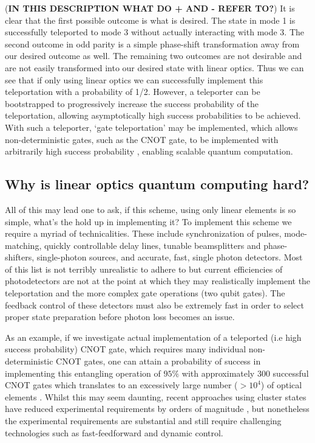 \documentclass[aps,pra,twocolumn,amsmath,amssymb,nofootinbib,superscriptaddress]{revtex4}
\begin{document}
(\textbf{IN THIS DESCRIPTION WHAT DO + AND - REFER TO?}) It is clear that the first possible outcome is what is desired. The state in mode 1 is successfully teleported to mode 3 without actually interacting with mode 3. The second outcome in odd parity is a simple phase-shift transformation away from our desired outcome as well. The remaining two outcomes are not desirable and are not easily transformed into our desired state with linear optics. Thus we can see that if only using linear optics we can successfully implement this teleportation with a probability of 1/2. However, a teleporter can be bootstrapped to progressively increase the success probability of the teleportation, allowing asymptotically high success probabilities to be achieved. With such a teleporter, `gate teleportation' may be implemented, which allows non-deterministic gates, such as the CNOT gate, to be implemented with arbitrarily high success probability \cite{knill}, enabling scalable quantum computation.

\subsection{Why is linear optics quantum computing hard?}

All of this may lead one to ask, if this scheme, using only linear elements is so simple, what's the hold up in implementing it? To implement this scheme we require a myriad of technicalities. These include synchronization of pulses, mode-matching, quickly controllable delay lines, tunable beamsplitters and phase-shifters, single-photon sources, and accurate, fast, single photon detectors. Most of this list is not terribly unrealistic to adhere to but current efficiencies of photodetectors are not at the point at which they may realistically implement the teleportation and the more complex gate operations (two qubit gates). The feedback control of these detectors must also be extremely fast in order to select proper state preparation before photon loss becomes an issue.

As an example, if we investigate actual implementation of a teleported (i.e high success probability) CNOT gate, which requires many individual non-deterministic CNOT gates, one can attain a probability of success in implementing this entangling operation of $95\%$ with approximately 300 successful CNOT gates which translates to an excessively large number ($>10^4$) of optical elements \cite{nielsen2}. Whilst this may seem daunting, recent approaches using cluster states have reduced experimental requirements by orders of magnitude \cite{bib:Nielsen04, bib:BrowneRudolph05}, but nonetheless the experimental requirements are substantial and still require challenging technologies such as fast-feedforward and dynamic control.
\end{document}
